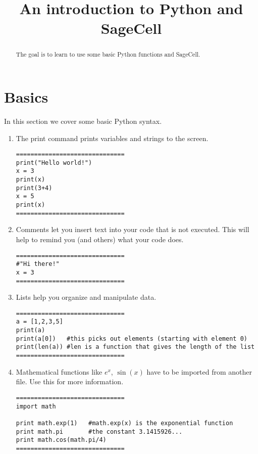 \documentclass{ximera}
\title{An introduction to Python and SageCell}
\begin{document}
\begin{abstract}  
The goal is to learn to use some basic Python functions and SageCell.
\end{abstract}  
\maketitle

\section{Basics}

In this section we cover some basic Python syntax.

    \begin{enumerate}
        \item The print command prints variables and strings to the screen.
\begin{verbatim}
==============================
print("Hello world!")
x = 3
print(x)
print(3+4)
x = 5
print(x)
==============================
\end{verbatim}

	\item Comments let you insert text into your code that is not executed. This will help to remind you (and others) what your code does.
\begin{verbatim}
==============================
#"Hi there!"
x = 3
==============================
\end{verbatim}
	\item Lists help you organize and manipulate data.
\begin{verbatim}
==============================
a = [1,2,3,5]
print(a)
print(a[0])   #this picks out elements (starting with element 0)
print(len(a)) #len is a function that gives the length of the list
==============================
\end{verbatim}
		\item Mathematical functions like $e^x$, $\sin(x)$ have to be imported from another file. Use this  for more information.
\begin{verbatim}
==============================
import math

print math.exp(1)   #math.exp(x) is the exponential function
print math.pi       #the constant 3.1415926...
print math.cos(math.pi/4)
==============================
\end{verbatim}
    \end{enumerate}
\end{document}
